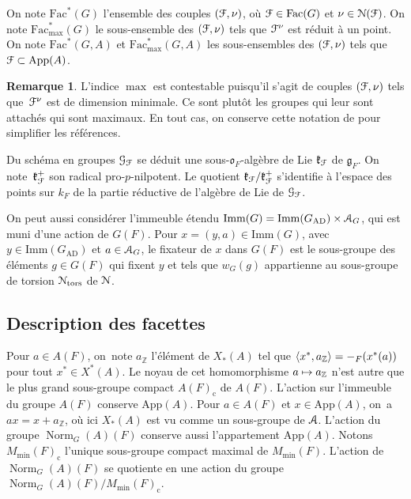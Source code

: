 \documentclass[11pt]{article}
\numberwithin{equation}{section}\providecommand{\og}{«\,}\providecommand{\fg}{\,»}
\let\mathcal \EuScript
\newcommand{\NoChangel}[1]{%
\expandafter\let\csname old\string#1\endcsname=#1
\let#1=\relax
\newcommand{#1}{\mathcode`l="716C\csname old\string#1\endcsname\mathcode`l="7160 }%
}
\let\<\langle
\let\>\rangle
\newcommand\mto{\mathchoice{\longmapsto}{\mapsto}{\mapsto}{\mapsto}}
\newcommand{\frg}{\mathfrak{g}}
\newcommand{\frk}{\mathfrak{k}}
\newcommand{\fro}{\mathfrak{o}}
\newcommand{\AD}{\mathrm{AD}}
\newcommand{\App}{\mathrm{App}}
\newcommand{\rc}{\mathrm{c}}
\newcommand{\Fac}{\mathrm{Fac}}
\newcommand{\Imm}{\mathrm{Imm}}
\newcommand{\tors}{\mathrm{tors}}
\DeclareMathOperator{\Norm}{Norm}
\DeclareMathOperator{\val}{val} \NoChangel{\val}
\newcommand{\cA}{\mathcal{A}}
\newcommand{\cF}{\mathcal{F}}
\newcommand{\cG}{\mathcal{G}}
\newcommand{\cN}{\mathcal{N}}
\newcommand{\ZZ}{\mathbb{Z}}
\theoremstyle{plain}
\theoremstyle{definition}
\newtheorem*{rem*}{Remarque}
\begin{document}
On note $\Fac^*(G)$ l'ensemble des couples $(\cF,\nu)$, où $\cF\in \Fac(G)$ et $\nu\in \cN(\cF)$. On note $\Fac^*_{\max}(G)$ le sous-ensemble des $(\cF,\nu)$ tels que $\cF^{\nu}$ est réduit à un point. On note $\Fac^*(G,A)$ et $\Fac^*_{\max}(G,A)$ les sous-ensembles des $(\cF,\nu)$ tels que $\cF\subset \App(A)$.

\begin{rem*}
L'indice $\max$ est contestable puisqu'il s'agit de couples $(\cF,\nu)$ tels que~$\cF^{\nu}$ est de dimension minimale. Ce sont plutôt les groupes qui leur sont attachés qui sont maximaux. En tout cas, on conserve cette notation de \cite{W2} pour simplifier les références.
\end{rem*}

Du schéma en groupes $\cG_{\cF}$ se déduit une sous-$\fro_{F}$-algèbre de Lie $\frk_{\cF}$ de $\frg_{F}$. On note~$\frk_{\cF}^+$ son radical pro-$p$-nilpotent. Le quotient $\frk_{\cF}/\frk_{\cF}^+$ s'identifie à l'espace des points sur $k_{F}$ de la partie réductive de l'algèbre de Lie de $\cG_{\cF}$.

On peut aussi considérer l'immeuble étendu $\Imm(G)=\Imm(G_{\AD})\times \cA_{G}$, qui est muni d'une action de $G(F)$. Pour $x=(y,a)\in \Imm(G)$, avec $y\in \Imm(G_{\AD})$ et $a\in \cA_{G}$, le fixateur de $x$ dans $G(F)$ est le sous-groupe des éléments $g\in G(F)$ qui fixent $y$ et tels que $w_{G}(g)$ appartienne au sous-groupe de torsion $\cN_{\tors}$ de $\cN$.

\subsection{Description des facettes}\label{description}

Pour $a\in A(F)$, on~note $a_{\ZZ}$ l'élément de $ X_{*}(A)$ tel que $\<x^*,a_{\ZZ}\>=-\val_{F}(x^*(a))$ pour tout $x^*\in X^*(A)$. Le noyau de cet homomorphisme $a\mto a_{\ZZ}$ n'est autre que le plus grand sous-groupe compact $A(F)_{\rc}$ de $A(F)$. L'action sur l'immeuble du groupe $A(F)$ conserve $\App(A)$. Pour $a\in A(F)$ et $x\in \App(A)$, on~a $ax= x+a_{\ZZ}$, où ici $X_{*}(A)$ est vu comme un sous-groupe de $\cA$. L'action du groupe $\Norm_{G}(A)(F)$ conserve aussi l'appartement $\App(A)$. Notons $M_{\min}(F)_{\rc}$ l'unique sous-groupe compact maximal de $M_{\min}(F)$. L'action de $\Norm_{G}(A)(F)$ se quotiente en une action du groupe $\Norm_{G}(A)(F)/M_{\min}(F)_{\rc}$.
\end{document}
